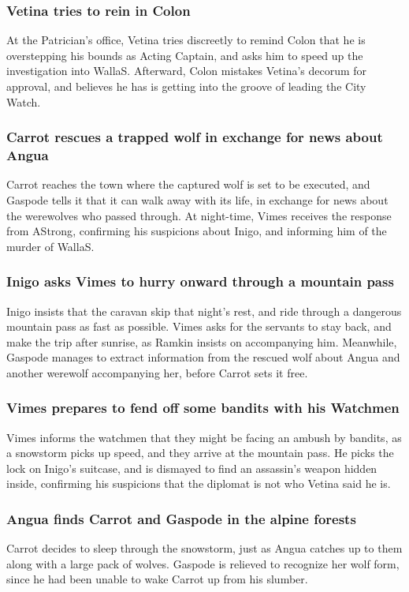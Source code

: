 \subsubsection{\Gls{Vetina} tries to rein in \Gls{Colon}}
At the Patrician's office, \Gls{Vetina} tries discreetly to remind \Gls{Colon} that he is
overstepping his bounds as Acting Captain, and asks him to speed up the investigation into
\Gls{WallaS}. Afterward, \Gls{Colon} mistakes \Gls{Vetina}'s decorum for approval, and believes he
has is getting into the groove of leading the City Watch.

\subsubsection{\Gls{Carrot} rescues a trapped wolf in exchange for news about \Gls{Angua}}
\Gls{Carrot} reaches the town where the captured wolf is set to be executed, and \Gls{Gaspode}
tells it that it can walk away with its life, in exchange for news about the werewolves who passed
through. At night-time, \Gls{Vimes} receives the response from \Gls{AStrong}, confirming his
suspicions about \Gls{Inigo}, and informing him of the murder of \Gls{WallaS}.

\subsubsection{\Gls{Inigo} asks \Gls{Vimes} to hurry onward through a mountain pass}
\Gls{Inigo} insists that the caravan skip that night's rest, and ride through a dangerous mountain
pass as fast as possible. \Gls{Vimes} asks for the servants to stay back, and make the trip after
sunrise, as \Gls{Ramkin} insists on accompanying him. Meanwhile, \Gls{Gaspode} manages to extract
information from the rescued wolf about \Gls{Angua} and another werewolf accompanying her, before
\Gls{Carrot} sets it free.

\subsubsection{\Gls{Vimes} prepares to fend off some bandits with his Watchmen}
\Gls{Vimes} informs the watchmen that they might be facing an ambush by bandits, as a snowstorm
picks up speed, and they arrive at the mountain pass. He picks the lock on \Gls{Inigo}'s suitcase,
and is dismayed to find an assassin's weapon hidden inside, confirming his suspicions that the
diplomat is not who \Gls{Vetina} said he is.

\subsubsection{\Gls{Angua} finds \Gls{Carrot} and \Gls{Gaspode} in the alpine forests}
\Gls{Carrot} decides to sleep through the snowstorm, just as \Gls{Angua} catches up to them along
with a large pack of wolves. \Gls{Gaspode} is relieved to recognize her wolf form, since he had
been unable to wake \Gls{Carrot} up from his slumber.


